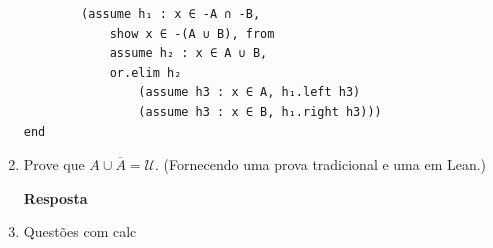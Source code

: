 \begin{enumerate}
\begin{lstlisting}
        (assume h₁ : x ∈ -A ∩ -B,
            show x ∈ -(A ∪ B), from
            assume h₂ : x ∈ A ∪ B,
            or.elim h₂
                (assume h3 : x ∈ A, h₁.left h3)
                (assume h3 : x ∈ B, h₁.right h3)))
end \end{lstlisting}

\item Prove que $A \cup \overline A = \mathcal U$. (Fornecendo uma prova tradicional e uma em Lean.)

\textbf{Resposta} 




\item Questões com calc
    
    
\end{enumerate}
